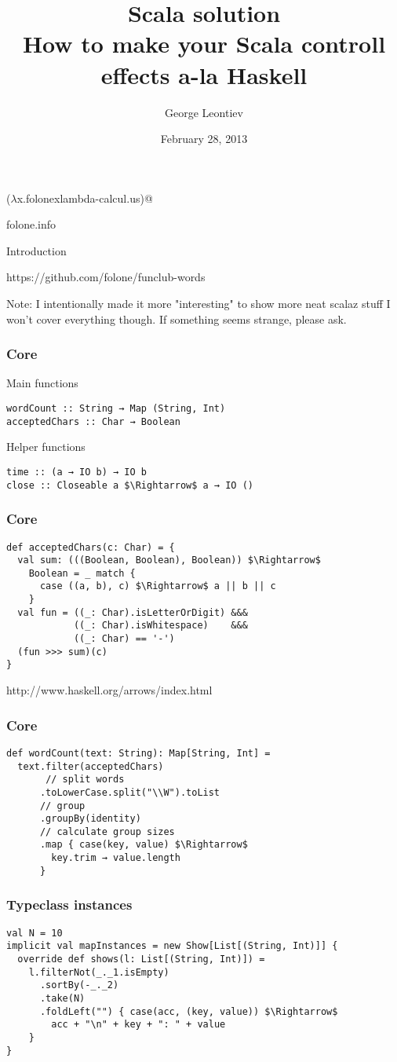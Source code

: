 \documentclass{beamer}
\title[Scala solution]{Scala solution\\How to make your Scala controll effects a-la Haskell}
\author{George Leontiev}
\institute{deltamethod GmbH}
\date{February 28, 2013}
\begin{document}
\begin{frame}
\titlepage
\centerline{($\lambda$x.folonexlambda-calcul.us)@}
\centerline{folone.info}
\end{frame}


\begin{frame}{Introduction}
  \Large \centerline{https://github.com/folone/funclub-words} \normalsize
  Note: I intentionally made it more "interesting" to show more neat scalaz stuff\newline
  I won't cover everything though. If something seems strange, please ask.
\end{frame}

\begin{frame}[fragile]
\frametitle{Core}
Main functions
\begin{lstlisting}[mathescape]
wordCount :: String → Map (String, Int)
acceptedChars :: Char → Boolean
\end{lstlisting}
Helper functions
\begin{lstlisting}[mathescape]
time :: (a → IO b) → IO b
close :: Closeable a $\Rightarrow$ a → IO ()
\end{lstlisting}
\end{frame}

\begin{frame}[fragile]
\frametitle{Core}
\begin{lstlisting}[mathescape]
def acceptedChars(c: Char) = {
  val sum: (((Boolean, Boolean), Boolean)) $\Rightarrow$
    Boolean = _ match {
      case ((a, b), c) $\Rightarrow$ a || b || c
    }
  val fun = ((_: Char).isLetterOrDigit) &&&
            ((_: Char).isWhitespace)    &&&
            ((_: Char) == '-')
  (fun >>> sum)(c)
}
\end{lstlisting}
http://www.haskell.org/arrows/index.html
\end{frame}

\begin{frame}[fragile]
\frametitle{Core}
\begin{lstlisting}[mathescape]
def wordCount(text: String): Map[String, Int] =
  text.filter(acceptedChars)
       // split words
      .toLowerCase.split("\\W").toList
      // group
      .groupBy(identity)
      // calculate group sizes
      .map { case(key, value) $\Rightarrow$
        key.trim → value.length
      }
\end{lstlisting}
\end{frame}

\begin{frame}[fragile]
\frametitle{Typeclass instances}
\begin{lstlisting}[mathescape]
val N = 10
implicit val mapInstances = new Show[List[(String, Int)]] {
  override def shows(l: List[(String, Int)]) =
    l.filterNot(_._1.isEmpty)
      .sortBy(-_._2)
      .take(N)
      .foldLeft("") { case(acc, (key, value)) $\Rightarrow$
        acc + "\n" + key + ": " + value
    }
}
\end{lstlisting}
\end{frame}
\end{document}
